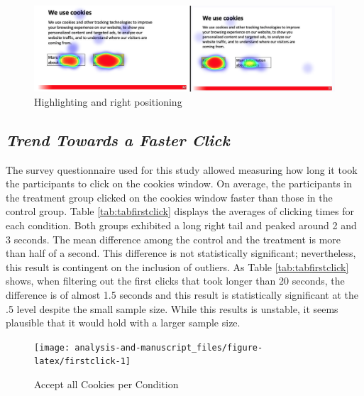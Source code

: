 \documentclass[
  11pt,
  letterpaper,
]{article}
\begin{document}
\begin{figure}

{\centering \includegraphics[width=1\linewidth]{hmaps} 

}

\caption{Highlighting and right positioning}\label{fig:hm}
\end{figure}

\hypertarget{trend-towards-a-faster-click}{%
\subsection{\texorpdfstring{\emph{Trend Towards a Faster Click}}{Trend Towards a Faster Click}}\label{trend-towards-a-faster-click}}

The survey questionnaire used for this study allowed measuring how long it took the participants to click on the cookies window. On average, the participants in the treatment group clicked on the cookies window faster than those in the control group. Table \ref{tab:tabfirstclick} displays the averages of clicking times for each condition. Both groups exhibited a long right tail and peaked around 2 and 3 seconds. The mean difference among the control and the treatment is more than half of a second. This difference is not statistically significant; nevertheless, this result is contingent on the inclusion of outliers. As Table \ref{tab:tabfirstclick} shows, when filtering out the first clicks that took longer than 20 seconds, the difference is of almost 1.5 seconds and this result is statistically significant at the .5 level despite the small sample size. While this results is unstable, it seems plausible that it would hold with a larger sample size.

\begin{figure}

{\centering \texttt{[image: analysis-and-manuscript\_files/figure-latex/firstclick-1]} 

}

\caption{Accept all Cookies per Condition}\label{fig:firstclick}
\end{figure}
\end{document}
